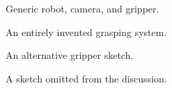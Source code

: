 \begin{figure}
\centering Generic robot, camera, and gripper.
\caption{An entirely invented grasping system.}
\label{fig:system}
\end{figure}

\begin{figure}
\centering An alternative gripper sketch.
\caption{A sketch omitted from the discussion.}
\label{fig:unused}
\end{figure}
